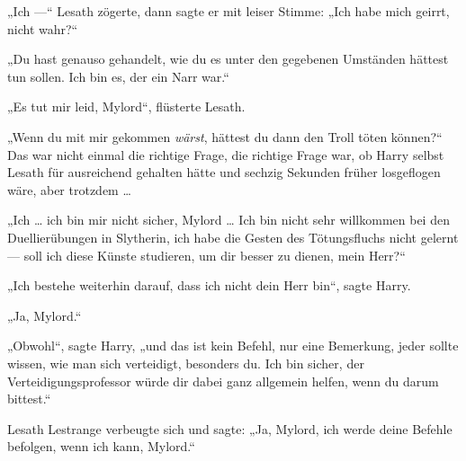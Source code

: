 „Ich —“ Lesath zögerte, dann sagte er mit leiser Stimme:
„Ich habe mich geirrt, nicht wahr?“

„Du hast genauso gehandelt, wie du es unter den gegebenen Umständen hättest tun sollen. Ich bin es, der ein Narr war.“

„Es tut mir leid, Mylord“, flüsterte Lesath.

„Wenn du mit mir gekommen \emph{wärst}, hättest du dann den Troll töten können?“ Das war nicht einmal die richtige Frage, die richtige Frage war, ob Harry selbst Lesath für ausreichend gehalten hätte und sechzig Sekunden früher losgeflogen wäre, aber trotzdem …

„Ich … ich bin mir nicht sicher, Mylord … Ich bin nicht sehr willkommen bei den Duellierübungen in Slytherin, ich habe die Gesten des Tötungsfluchs nicht gelernt — soll ich diese Künste studieren, um dir besser zu dienen, mein Herr?“

„Ich bestehe weiterhin darauf, dass ich nicht dein Herr bin“, sagte Harry.

„Ja, Mylord.“

„Obwohl“, sagte Harry, „und das ist kein Befehl, nur eine Bemerkung, jeder sollte wissen, wie man sich verteidigt, besonders du. Ich bin sicher, der Verteidigungsprofessor würde dir dabei ganz allgemein helfen, wenn du darum bittest.“

Lesath Lestrange verbeugte sich und sagte:
„Ja, Mylord, ich werde deine Befehle befolgen, wenn ich kann, Mylord.“

